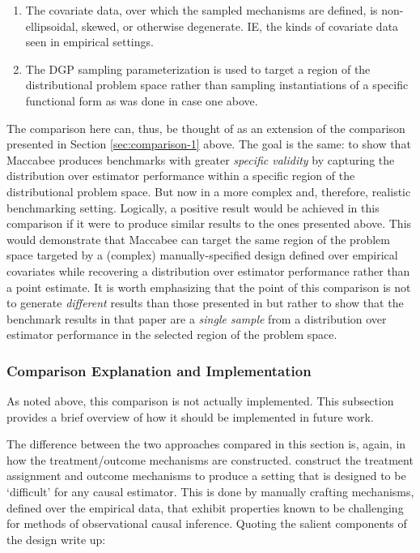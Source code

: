 \documentclass[../main.tex]{subfiles}
\begin{document}
\begin{enumerate}
    \item The covariate data, over which the sampled mechanisms are defined, is non-ellipsoidal, skewed, or otherwise degenerate. IE, the kinds of covariate data seen in empirical settings.
    
    \item The DGP sampling parameterization is used to target a region of the distributional problem space rather than sampling instantiations of a specific functional form as was done in case one above.
\end{enumerate}

The comparison here can, thus, be thought of as an extension of the comparison presented in Section \ref{sec:comparison-1} above. The goal is the same: to show that Maccabee produces benchmarks with greater \textit{specific validity} by capturing the distribution over estimator performance within a specific region of the distributional problem space. But now in a more complex and, therefore, realistic benchmarking setting. Logically, a positive result would be achieved in this comparison if it were to produce similar results to the ones presented above. This would demonstrate that Maccabee can target the same region of the problem space targeted by a (complex) manually-specified design defined over empirical covariates while recovering a distribution over estimator performance rather than a point estimate. It is worth emphasizing that the point of this comparison is not to generate \textit{different} results than those presented in \textcite{Diamond2013GeneticStudies} but rather to show that the benchmark results in that paper are a \textit{single sample} from a distribution over estimator performance in the selected region of the problem space.

\subsubsection{Comparison Explanation and Implementation}

As noted above, this comparison is not actually implemented. This subsection provides a brief overview of how it should be implemented in future work.

\vspace{\baselineskip}

The difference between the two approaches compared in this section is, again, in how the treatment/outcome mechanisms are constructed. \textcite{Diamond2013GeneticStudies} construct the treatment assignment and outcome mechanisms to produce a setting that is designed to be `difficult' for any causal estimator. This is done by manually crafting mechanisms, defined over the empirical data, that exhibit properties known to be challenging for methods of observational causal inference. Quoting the salient components of the design write up:
\end{document}
